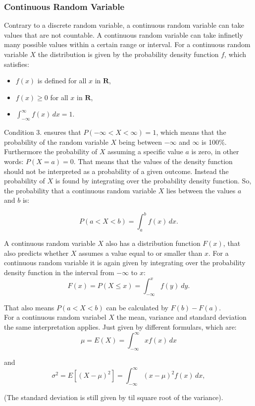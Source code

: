\subsubsection{Continuous Random Variable}
Contrary to a discrete random variable, a continuous random variable can take values that are not countable. A continuous random variable can take infinetly many possible values within a certain range or interval. For a continuous random variable $X$ the distribution is given by the probability density function $f$, which satisfies:

\begin{itemize}
	\item $f(x)$ is defined for all $x$ in $\textbf{R}$,
	\item $f(x) \geq 0$ for all $x$ in $\textbf{R}$,
	\item $\int_{-\infty}^{\infty} f(x) \, dx = 1.$
\end{itemize}

\noindent Condition 3. ensures that $P(-\infty < X < \infty) = 1$, which means that the probability of the random variable $X$ being between $-\infty$ and $\infty$ is 100\%. Furthermore the probability of $X$ assuming a specific value $a$ is zero, in other words: $P(X=a)=0$. That means that the values of the density function should not be interpreted as a probability of a given outcome. Instead the probability of $X$ is found by integrating over the probability density function. So, the probability that a continuous random variable $X$ lies between the values $a$ and $b$ is: 

\begin{equation}
P(a < X < b) = \int_a^b f(x) \, dx.
\end{equation}


\noindent A continuous random variable $X$ also has a distribution function $F(x)$, that also predicts whether $X$ assumes a value equal to or smaller than $x$. For a continuous random variable it is again given by integrating over the probability density function in the interval from $-\infty$ to $x$:
\begin{equation}
F(x) = P(X \leq x) = \int_{-\infty}^{x} f(y) \ dy.
\end{equation}


\noindent That also means $P(a<X<b)$ can be calculated by $F(b)-F(a)$.
\\

\noindent For a continuous random variabel $X$ the mean, variance and standard deviation the same interpretation applies. Just given by different formulars, which are:
\begin{equation}
	\mu = E(X) = \int_{-\infty}^{\infty} x f(x) \, dx
\end{equation}

\noindent and
\begin{equation}
\sigma^2 = E\left[(X - \mu)^2\right] = \int_{-\infty}^{\infty} (x - \mu)^2 f(x) \, dx,
\end{equation}

\noindent (The standard deviation is still given by til square root of the variance).

